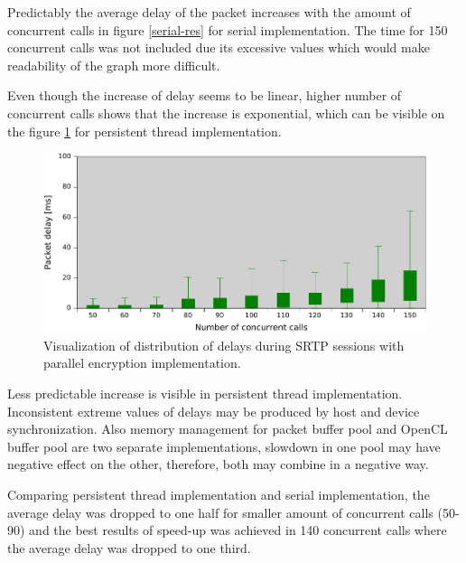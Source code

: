Predictably the average delay of the packet increases with the amount of 
concurrent calls in figure \ref{serial-res} for serial implementation. The time
for 150 concurrent calls was not included due its excessive values which would
make readability of the graph more difficult. 

Even though the increase of delay seems to be linear, higher number of 
concurrent calls shows that the increase is exponential, which can be visible
on the figure \ref{pt-res} for persistent thread implementation.

\begin{figure}[H]
\centering
\includegraphics[width=15cm]{fig/persistent-thread-res.pdf}
\caption[Packet delay using parallel implementation]{Visualization of 
distribution of delays during SRTP sessions with parallel encryption 
implementation.}
\label{pt-res}
\end{figure}

Less predictable increase is visible in persistent thread implementation.
Inconsistent extreme values of delays may be produced by host and device
synchronization. Also memory management for packet buffer pool and OpenCL
buffer pool are two separate implementations, slowdown in one pool may have
negative effect on the other, therefore, both may combine in a negative way.

Comparing persistent thread implementation and serial implementation, the 
average delay was dropped to one half for smaller amount of concurrent calls
(50-90) and the best results of speed-up was achieved in 140 concurrent calls
where the average delay was dropped to one third.


\vspace{25em}

